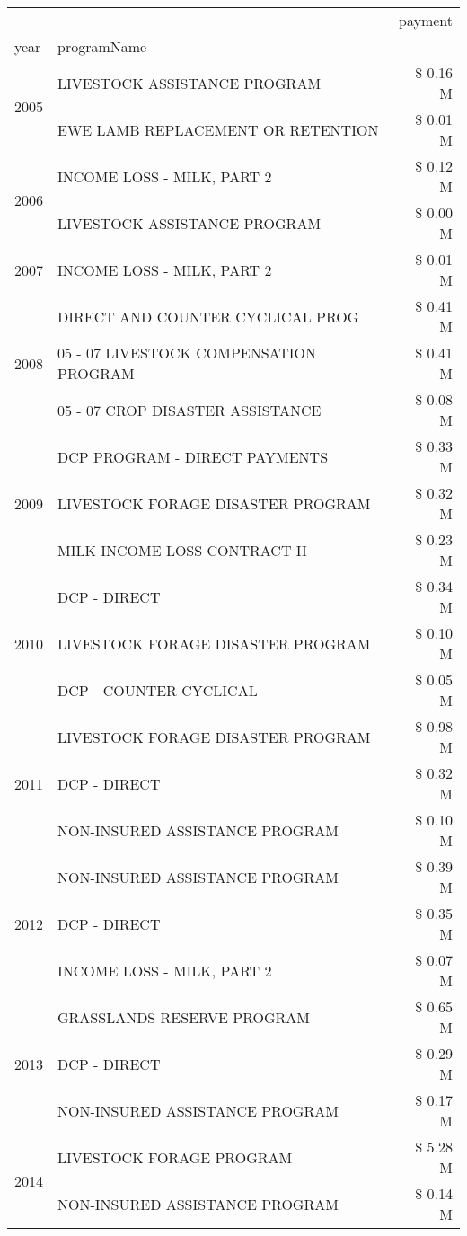 \begin{tabular}{llr}
\toprule
 &  & payment \\
year & programName &  \\
\midrule
\multirow[t]{2}{*}{2005} & LIVESTOCK ASSISTANCE PROGRAM & \$ 0.16 M \\
 & EWE LAMB REPLACEMENT OR RETENTION & \$ 0.01 M \\
\cline{1-3}
\multirow[t]{2}{*}{2006} & INCOME LOSS - MILK, PART 2 & \$ 0.12 M \\
 & LIVESTOCK ASSISTANCE PROGRAM & \$ 0.00 M \\
\cline{1-3}
2007 & INCOME LOSS - MILK, PART 2 & \$ 0.01 M \\
\cline{1-3}
\multirow[t]{3}{*}{2008} & DIRECT AND COUNTER CYCLICAL PROG & \$ 0.41 M \\
 & 05 - 07 LIVESTOCK COMPENSATION PROGRAM & \$ 0.41 M \\
 & 05 - 07 CROP DISASTER ASSISTANCE & \$ 0.08 M \\
\cline{1-3}
\multirow[t]{3}{*}{2009} & DCP PROGRAM - DIRECT PAYMENTS & \$ 0.33 M \\
 & LIVESTOCK FORAGE DISASTER  PROGRAM & \$ 0.32 M \\
 & MILK INCOME LOSS CONTRACT II & \$ 0.23 M \\
\cline{1-3}
\multirow[t]{3}{*}{2010} & DCP - DIRECT & \$ 0.34 M \\
 & LIVESTOCK FORAGE DISASTER PROGRAM & \$ 0.10 M \\
 & DCP - COUNTER CYCLICAL & \$ 0.05 M \\
\cline{1-3}
\multirow[t]{3}{*}{2011} & LIVESTOCK FORAGE DISASTER PROGRAM & \$ 0.98 M \\
 & DCP - DIRECT & \$ 0.32 M \\
 & NON-INSURED ASSISTANCE PROGRAM & \$ 0.10 M \\
\cline{1-3}
\multirow[t]{3}{*}{2012} & NON-INSURED ASSISTANCE PROGRAM & \$ 0.39 M \\
 & DCP - DIRECT & \$ 0.35 M \\
 & INCOME LOSS - MILK, PART 2 & \$ 0.07 M \\
\cline{1-3}
\multirow[t]{3}{*}{2013} & GRASSLANDS RESERVE PROGRAM & \$ 0.65 M \\
 & DCP - DIRECT & \$ 0.29 M \\
 & NON-INSURED ASSISTANCE PROGRAM & \$ 0.17 M \\
\cline{1-3}
\multirow[t]{3}{*}{2014} & LIVESTOCK FORAGE PROGRAM & \$ 5.28 M \\
 & NON-INSURED ASSISTANCE PROGRAM & \$ 0.14 M \\

\end{tabular}
